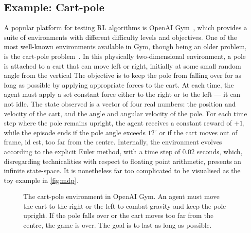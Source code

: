 \subsection{Example: Cart-pole}
\label{sec:cartpole}
A popular platform for testing RL algorithms is OpenAI Gym~\autocite{gym}, which provides a suite of environments with different difficulty levels and objectives.
One of the most well-known environments available in Gym, though being an older problem, is the cart-pole problem~\autocite{barto1983}.
In this physically two-dimensional environment, a pole is attached to a cart that can move left or right, initially at some small random angle from the vertical
The objective is to keep the pole from falling over for as long as possible by applying appropriate forces to the cart.
At each time, the agent must apply a set constant force either to the right or to the left — it can not idle.
The state observed is a vector of four real numbers: the position and velocity of the cart, and the angle and angular velocity of the pole.
For each time step where the pole remains upright, the agent receives a constant reward of $+1$, while the episode ends if the pole angle exceeds $12^\circ$ or if the cart moves out of frame, id est, too far from the centre.
Internally, the environment evolves according to the explicit Euler method, with a time step of $0.02$ seconds\footnotemark, which, disregarding technicalities with respect to floating point arithmetic, presents an infinite state-space.
It is nonetheless far too complicated to be visualised as the toy example in \cref{fig:mdp}.


\begin{figure}
    \centering
    \caption[
        The cart-pole environment in OpenAI Gym.
    ]{
        The cart-pole environment in OpenAI Gym.
        An agent must move the cart to the right or the left to combat gravity and keep the pole upright.
        If the pole falls over or the cart moves too far from the centre, the game is over.
        The goal is to last as long as possible.
    }
    \label{fig:cartpole}
\end{figure}

